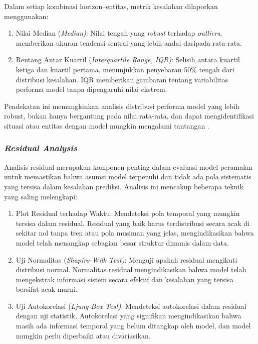 Dalam setiap kombinasi horizon–entitas, metrik kesalahan dilaporkan menggunakan:
\begin{enumerate}[label=\alph*.]
    \item Nilai Median (\textit{Median)}: Nilai tengah yang \textit{robust} terhadap \textit{outliers}, memberikan ukuran tendensi sentral yang lebih andal daripada rata-rata.
    \item Rentang Antar Kuartil (\textit{Interquartile Range, IQR)}: Selisih antara kuartil ketiga dan kuartil pertama, menunjukkan penyebaran 50\% tengah dari distribusi kesalahan. IQR memberikan gambaran tentang variabilitas performa model tanpa dipengaruhi nilai ekstrem.
\end{enumerate}

Pendekatan ini memungkinkan analisis distribusi performa model yang lebih robust, bukan hanya bergantung pada nilai rata-rata, dan dapat mengidentifikasi situasi atau entitas dengan model mungkin mengalami tantangan \autocite{Petropoulos2023ForecastEval,Spiliotis2020ForecastingBenchmarks}.

\subsubsection{\textit{Residual Analysis}}

Analisis residual merupakan komponen penting dalam evaluasi model peramalan untuk memastikan bahwa asumsi model terpenuhi dan tidak ada pola sistematis yang tersisa dalam kesalahan prediksi. Analisis ini mencakup beberapa teknik yang saling melengkapi:

\begin{enumerate}[label=\alph*.]
    \item Plot Residual terhadap Waktu: Mendeteksi pola temporal yang mungkin tersisa dalam residual. Residual yang baik harus terdistribusi secara acak di sekitar nol tanpa tren atau pola musiman yang jelas, mengindikasikan bahwa model telah menangkap sebagian besar struktur dinamis dalam data.
    
    \item Uji Normalitas (\textit{Shapiro-Wilk Test)}: Menguji apakah residual mengikuti distribusi normal. Normalitas residual mengindikasikan bahwa model telah mengekstrak informasi sistem secara efektif dan kesalahan yang tersisa bersifat acak murni.
    
    \item Uji Autokorelasi (\textit{Ljung-Box Test)}: Mendeteksi autokorelasi dalam residual dengan uji statistik. Autokorelasi yang signifikan mengindikasikan bahwa masih ada informasi temporal yang belum ditangkap oleh model, dan model mungkin perlu diperbaiki atau divariasikan.
\end{enumerate}

